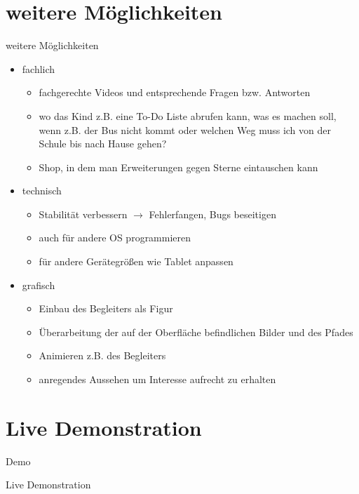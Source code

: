 \documentclass[10pt,fleqn]{beamer}
\begin{document}
\section{weitere Möglichkeiten}
\begin{frame}[t]{weitere Möglichkeiten}
\begin{itemize}
	\item fachlich
	\begin{itemize}
		\item fachgerechte Videos und entsprechende Fragen bzw. Antworten
		\item wo das Kind z.B. eine To-Do Liste abrufen kann, was es machen soll,
		wenn z.B. der Bus nicht kommt oder welchen Weg muss ich von der Schule bis nach
		Hause gehen?
		\item Shop, in dem man Erweiterungen gegen Sterne eintauschen kann
	\end{itemize}
	\item technisch
		\begin{itemize}
		\item Stabilität verbessern $\rightarrow$ Fehlerfangen, Bugs beseitigen
		\item auch für andere OS programmieren
		\item für andere Gerätegrößen wie Tablet anpassen
	\end{itemize}
	\item grafisch
	\begin{itemize}
		\item Einbau des Begleiters als Figur
		\item Überarbeitung der auf der Oberfläche befindlichen Bilder und des Pfades
		\item Animieren z.B. des Begleiters
		\item anregendes Aussehen um Interesse aufrecht zu erhalten
	\end{itemize}
	
\end{itemize}

\end{frame}

\section{Live Demonstration}
\begin{frame}[t]{Demo}
	\begin{center}
		\begin{Huge}
			Live Demonstration
		\end{Huge}
	\end{center}
\end{frame}
\end{document}
